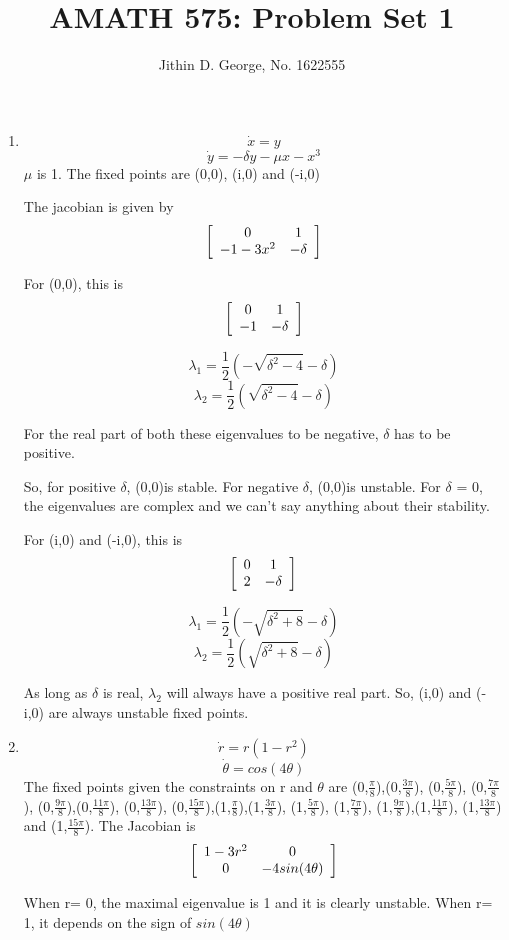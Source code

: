 \documentclass[a4paper]{article}
\title{AMATH 575: Problem Set 1}
\author{Jithin D. George, No. 1622555}
\newenvironment{mat}{\left[ \begin{array}{ccccccccccccc}}{\end{array}\right]}
\newcommand\bcm{\begin{mat}}
\newcommand\ecm{\end{mat}}
\begin{document}
\maketitle
\begin{enumerate}

	
	\item 
	
\[\dot{x} = y \]
\[ \dot{y} = - \delta y - \mu x - x^3 \]
$\mu$ is 1.
The fixed points are (0,0), (i,0) and (-i,0)

The jacobian is given by 
\[ \bcm   0 & 1\\ -1 -3x^2 &-\delta  \ecm \]

For (0,0), this is 
\[ \bcm   0 & 1\\ -1 &-\delta  \ecm \]

\[\lambda_1 = \frac{1}{2}(-\sqrt{\delta^2-4} -\delta) \]
\[\lambda_2 = \frac{1}{2}(\sqrt{\delta^2-4} -\delta) \]

For the real part of both these eigenvalues to be negative, $\delta$ has to be positive.

So, for positive $\delta$, (0,0)is stable.
For negative $\delta$, (0,0)is unstable.
For $ \delta$ = 0, the eigenvalues are complex and we can't say anything about their stability.

For (i,0) and (-i,0), this is 
\[ \bcm   0 & 1\\ 2 &-\delta  \ecm \]

\[\lambda_1 = \frac{1}{2}(-\sqrt{\delta^2+8} -\delta) \]
\[\lambda_2 = \frac{1}{2}(\sqrt{\delta^2+8} -\delta) \]

As long as $\delta$ is real, $ \lambda_2$ will always have a positive real part. So, (i,0) and (-i,0) are always unstable fixed points.


\item 

\[\dot{r}= r(1-r^2)\]
\[\dot{\theta}= cos(4\theta)\]
The fixed points given the constraints on r and $\theta$ are (0,$\frac{\pi}{8}$),(0,$\frac{3\pi}{8}$), (0,$\frac{5 \pi}{8}$), (0,$\frac{7\pi}{8}$), (0,$\frac{9\pi}{8}$),(0,$\frac{11\pi}{8}$), (0,$\frac{13\pi}{8}$), (0,$\frac{15\pi}{8}$),(1,$\frac{\pi}{8}$),(1,$\frac{3\pi}{8}$), (1,$\frac{5 \pi}{8}$), (1,$\frac{7\pi}{8}$), (1,$\frac{9\pi}{8}$),(1,$\frac{11\pi}{8}$), (1,$\frac{13\pi}{8}$) and (1,$\frac{15\pi}{8}$).
The Jacobian is 
\[\bcm 1-3r^2 & 0\\0  &- 4sin(4\theta)  \ecm \]

When r= 0, the maximal eigenvalue is 1 and it is clearly unstable. When r= 1,
it depends on the sign of $sin(4\theta)$


\end{enumerate}
\end{document}
